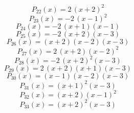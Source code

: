 \subitem \begin{dmath*}P_{22}(x) = 2 \, {\left(x + 2\right)}^{2} \end{dmath*}\vspace{-1.2cm}
\subitem \begin{dmath*}P_{23}(x) = -2 \, {\left(x - 1\right)}^{2} \end{dmath*}\vspace{-1.2cm}
\subitem \begin{dmath*}P_{24}(x) = -2 \, {\left(x + 1\right)} {\left(x - 1\right)} \end{dmath*}\vspace{-1.2cm}
\subitem \begin{dmath*}P_{25}(x) = -2 \, {\left(x + 2\right)} {\left(x - 3\right)} \end{dmath*}\vspace{-1.2cm}
\subitem \begin{dmath*}P_{26}(x) = {\left(x + 2\right)} {\left(x - 2\right)} {\left(x - 3\right)} \end{dmath*}\vspace{-1.2cm}
\subitem \begin{dmath*}P_{27}(x) = 2 \, {\left(x + 2\right)} {\left(x - 2\right)}^{2} \end{dmath*}\vspace{-1.2cm}
\subitem \begin{dmath*}P_{28}(x) = -2 \, {\left(x + 2\right)}^{2} {\left(x - 3\right)} \end{dmath*}\vspace{-1.2cm}
\subitem \begin{dmath*}P_{29}(x) = 2 \, {\left(x + 2\right)} {\left(x + 1\right)} {\left(x - 3\right)} \end{dmath*}\vspace{-1.2cm}
\subitem \begin{dmath*}P_{30}(x) = {\left(x - 1\right)} {\left(x - 2\right)} {\left(x - 3\right)} \end{dmath*}\vspace{-1.2cm}
\subitem \begin{dmath*}P_{31}(x) = {\left(x + 1\right)}^{2} {\left(x - 3\right)} \end{dmath*}\vspace{-1.2cm}
\subitem \begin{dmath*}P_{32}(x) = {\left(x + 2\right)} {\left(x - 1\right)}^{2} \end{dmath*}\vspace{-1.2cm}
\subitem \begin{dmath*}P_{33}(x) = {\left(x + 2\right)}^{2} {\left(x - 3\right)} \end{dmath*}\vspace{-1.2cm}
